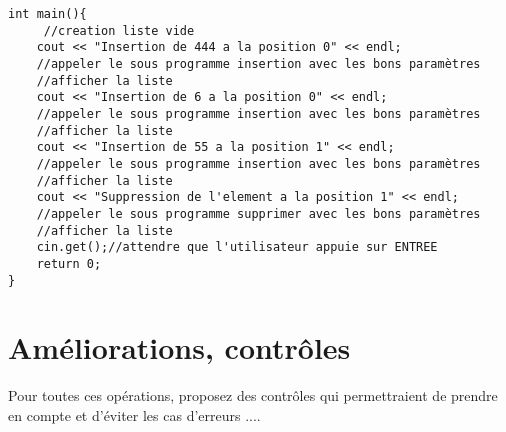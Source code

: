\documentclass[french]{article}
\begin{document}
	\begin{lstlisting}
int main(){
     //creation liste vide
    cout << "Insertion de 444 a la position 0" << endl;
    //appeler le sous programme insertion avec les bons paramètres
    //afficher la liste
    cout << "Insertion de 6 a la position 0" << endl;
    //appeler le sous programme insertion avec les bons paramètres
    //afficher la liste
    cout << "Insertion de 55 a la position 1" << endl;
    //appeler le sous programme insertion avec les bons paramètres
    //afficher la liste
    cout << "Suppression de l'element a la position 1" << endl;
    //appeler le sous programme supprimer avec les bons paramètres
    //afficher la liste
    cin.get();//attendre que l'utilisateur appuie sur ENTREE
    return 0;	 
}
\end{lstlisting}
	
	\section{Améliorations, contrôles}
	Pour toutes ces opérations, proposez des contrôles qui permettraient de prendre en compte et d’éviter les cas d’erreurs ....
\end{document}
